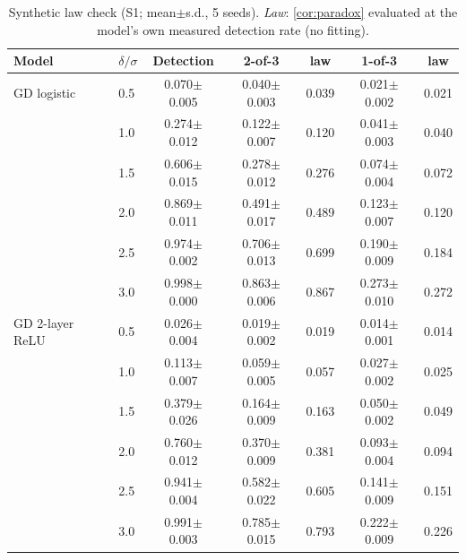 \begin{table}[h]\centering\small
\caption{Synthetic law check (S1; mean$\pm$s.d., 5 seeds). \emph{Law}: \cref{cor:paradox} evaluated at the model's own measured detection rate (no fitting).}\label{tab:law}
\setlength{\tabcolsep}{3pt}\begin{tabular}{llccccc}\toprule
Model & $\delta/\sigma$ & Detection & 2-of-3 & law & 1-of-3 & law\\\midrule
GD logistic & 0.5 & 0.070$\pm$0.005 & 0.040$\pm$0.003 & 0.039 & 0.021$\pm$0.002 & 0.021\\
 & 1.0 & 0.274$\pm$0.012 & 0.122$\pm$0.007 & 0.120 & 0.041$\pm$0.003 & 0.040\\
 & 1.5 & 0.606$\pm$0.015 & 0.278$\pm$0.012 & 0.276 & 0.074$\pm$0.004 & 0.072\\
 & 2.0 & 0.869$\pm$0.011 & 0.491$\pm$0.017 & 0.489 & 0.123$\pm$0.007 & 0.120\\
 & 2.5 & 0.974$\pm$0.002 & 0.706$\pm$0.013 & 0.699 & 0.190$\pm$0.009 & 0.184\\
 & 3.0 & 0.998$\pm$0.000 & 0.863$\pm$0.006 & 0.867 & 0.273$\pm$0.010 & 0.272\\
GD 2-layer ReLU & 0.5 & 0.026$\pm$0.004 & 0.019$\pm$0.002 & 0.019 & 0.014$\pm$0.001 & 0.014\\
 & 1.0 & 0.113$\pm$0.007 & 0.059$\pm$0.005 & 0.057 & 0.027$\pm$0.002 & 0.025\\
 & 1.5 & 0.379$\pm$0.026 & 0.164$\pm$0.009 & 0.163 & 0.050$\pm$0.002 & 0.049\\
 & 2.0 & 0.760$\pm$0.012 & 0.370$\pm$0.009 & 0.381 & 0.093$\pm$0.004 & 0.094\\
 & 2.5 & 0.941$\pm$0.004 & 0.582$\pm$0.022 & 0.605 & 0.141$\pm$0.009 & 0.151\\
 & 3.0 & 0.991$\pm$0.003 & 0.785$\pm$0.015 & 0.793 & 0.222$\pm$0.009 & 0.226\\
\bottomrule\end{tabular}\end{table}

